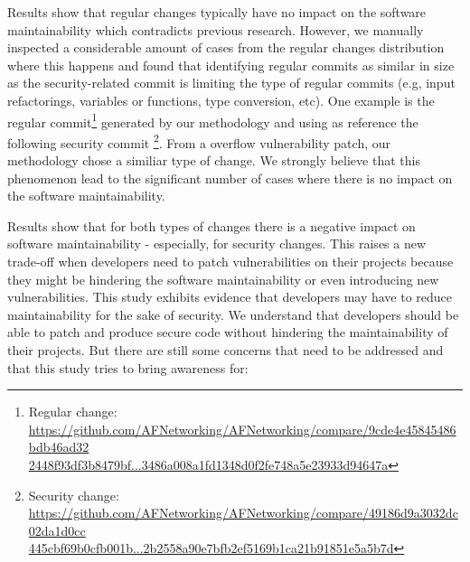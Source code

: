 \documentclass[10pt,conference]{IEEEtran}
\newcommand\Sof[1]{\nb{Sofia}{red}{#1}}
\begin{document}
Results show that regular changes typically have no impact on the 
software maintainability which contradicts previous research\Sof{missing citation}.
However, we manually inspected a considerable amount of cases from
the regular changes distribution where this happens and found that 
identifying regular commits as similar in size as the security-related 
commit is limiting the type of regular commits (e.g, input 
refactorings, variables or functions, type conversion, etc).  
One example is the regular commit\footnote{Regular change: 
\url{https://github.com/AFNetworking/AFNetworking/compare/9cde4e45845486bdb46ad32
2448f93df3b8479bf...3486a008a1fd1348d0f2fe748a5e23933d94647a}} generated 
by our methodology and using as reference the following security commit
\footnote{Security change: 
\url{https://github.com/AFNetworking/AFNetworking/compare/49186d9a3032dc02da1d0cc
445cbf69b0cfb001b...2b2558a90e7bfb2ef5169b1ca21b91851e5a5b7d}}. From a
overflow vulnerability patch, our methodology chose a similiar
type of change. We strongly believe that this phenomenon lead
to the significant number of cases where there is no impact
on the software maintainability.

Results show that for both types of changes there is a negative impact
on software maintainability - especially, for security changes. This raises 
a new trade-off when developers need to patch vulnerabilities on their projects
because they might be hindering the software maintainability or even introducing
new vulnerabilities. This study exhibits evidence that developers may have to
reduce maintainability for the sake of security. We understand that developers
should be able to patch and produce secure code without hindering the maintainability of
their projects. But there are still some concerns that need to be addressed
and that this study tries to bring awareness for:
\end{document}
